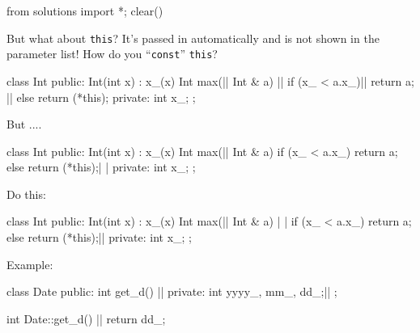 \begin{python0}
from solutions import *; clear()
\end{python0}

But what about \texttt{this}? It's passed in automatically and is not shown in the parameter list! How do you ``\texttt{const}'' \texttt{this}?

\begin{consolethree}[escapeinside=||]
class Int
{
public:
    Int(int x)
        : x_(x)
    {}
    Int max(|| Int & a)    ||
    {
        if (x_ < a.x_)||
            return a;                    ||
        else
            return (*this);
    }
private:
    int x_;
};
\end{consolethree}

But ....

\begin{consolethree}[escapeinside=||]
class Int
{
public:
    Int(int x)
        : x_(x)
    {}
    Int max(|| Int & a)
    {
        if (x_ < a.x_)
            return a;
        else
            return (*this);| |
    }
private:
    int x_;
};
\end{consolethree}

Do this:

\begin{consolethree}[escapeinside=||]
class Int
{
public:
    Int(int x)
        : x_(x)
    {}
    Int max(|| Int & a) | |
    {
        if (x_ < a.x_)
            return a;
        else
            return (*this);||
    }
private:
    int x_;
};
\end{consolethree}
Example:

\begin{consolethree}[escapeinside=||]
class Date
{
public:
    int get_d() ||
private:
    int yyyy_, mm_, dd_;||
};

int Date::get_d() ||
{
    return dd_;
}
\end{consolethree}

